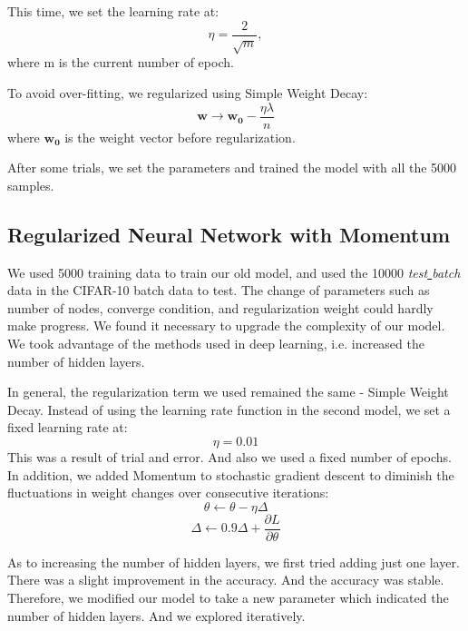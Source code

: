 \documentclass{article} %
\begin{document}
This time, we set the learning rate at:
\begin{equation}
\eta = \frac{2}{\sqrt{m}},
\end{equation}
where m is the current number of epoch. 

To avoid over-fitting, we regularized using Simple Weight Decay:
\begin{equation}
\mathbf{w}\rightarrow\mathbf{w_0}-\frac{\eta\lambda}{n}
\end{equation}
where $\mathbf{w_0}$ is the weight vector before regularization.

After some trials, we set the parameters and trained the model with all the 5000 samples.
\subsection{Regularized Neural Network with Momentum}
We used 5000 training data to train our old model, and used the 10000 \emph{test\underline{ }batch}  data in the CIFAR-10 batch data to test.
The change of parameters such as number of nodes, converge condition, and regularization weight could hardly make progress. We found it necessary to upgrade the complexity of our model. We took advantage of the methods used in deep learning, i.e. increased the number of hidden layers.

In general, the regularization term we used remained the same - Simple Weight Decay. Instead of using the learning rate function in the second model, we set a fixed learning rate at:
\begin{equation}
\eta = 0.01 
\end{equation}
This was a result of trial and error. And also we used a fixed number of epochs.
In addition, we added Momentum to stochastic gradient descent to diminish the fluctuations in weight changes over consecutive iterations:
\begin{equation}
\theta \leftarrow \theta - \eta \Delta
\end{equation}
\begin{equation}
\Delta \leftarrow 0.9 \Delta + \frac{\partial L}{\partial \theta}
\end{equation}

As to increasing the number of hidden layers, we first tried adding just one layer. There was a slight improvement in the accuracy. And the accuracy was stable. Therefore, we modified our model to take a new parameter which indicated the number of hidden layers. And we explored iteratively.
\end{document}
